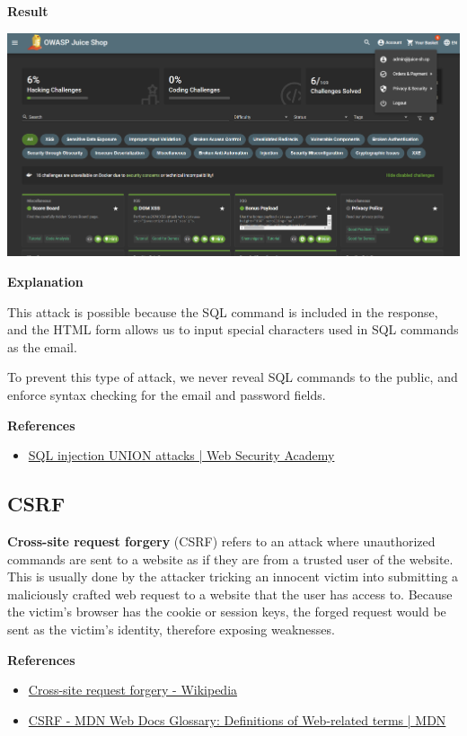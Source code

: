 \documentclass[12pt, a4paper]{article}
\begin{document}
\begin{enumerate}[label=(\alph*)]
    \textbf{Result}

    \includegraphics[width=\linewidth]{4-1-e_solved.png}

    \textbf{Explanation}

    This attack is possible because the SQL command is included in the response, and
    the HTML form allows us to input special characters used in SQL commands as the
    email.

    To prevent this type of attack, we never reveal SQL commands to the public, and
    enforce syntax checking for the email and password fields.

    \textbf{References}
    \begin{itemize}
      \item \href{https://portswigger.net/web-security/sql-injection/union-attacks}{SQL injection UNION attacks | Web Security Academy}
    \end{itemize}
  \end{enumerate}

  \pagebreak
  \subsection{CSRF}
  \textbf{Cross-site request forgery} (CSRF) refers to an attack
  where unauthorized commands are sent to a website as if they are
  from a trusted user of the website. This is usually done by the attacker
  tricking an innocent victim into submitting a maliciously crafted web request
  to a website that the user has access to. Because the victim's browser has the
  cookie or session keys, the forged request would be sent as the victim's
  identity, therefore exposing weaknesses.

  \textbf{References}
  \begin{itemize}
    \item \href{https://en.wikipedia.org/wiki/Cross-site_request_forgery}{Cross-site request forgery - Wikipedia}
    \item \href{https://developer.mozilla.org/en-US/docs/Glossary/CSRF}{CSRF - MDN Web Docs Glossary: Definitions of Web-related terms | MDN}
  \end{itemize}
\end{document}
